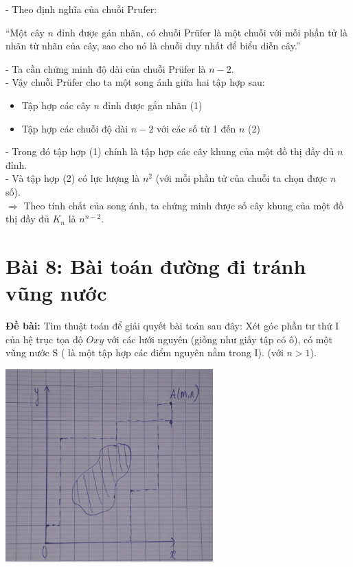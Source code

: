 \documentclass[12pt]{article}
\begin{document}
\begin{sloppypar}
- Theo định nghĩa của chuỗi Prufer:

\begin{center}
``Một cây \(n\) đỉnh được gán nhãn, có chuỗi Prüfer là một chuỗi với mỗi phần tử là nhãn từ  nhãn của cây, sao cho nó là chuỗi duy nhất để biểu diễn cây.''
\end{center}

- Ta cần chứng minh độ dài của chuỗi Prüfer là \(n-2\). \\
- Vậy chuỗi Prüfer cho ta một song ánh giữa hai tập hợp sau:

\begin{itemize}
    \item Tập hợp các cây \(n\) đỉnh được gắn nhãn                      (1)
    \item Tập hợp các chuỗi độ dài \(n-2\) với các số từ 1 đến \(n\)    (2)
\end{itemize}

- Trong đó tập hợp (1) chính là tập hợp các cây khung của một đồ thị đầy đủ \(n\) đỉnh. \\
- Và tập hợp (2) có lực lượng là \(n^{2}\) (với mỗi phần tử của chuỗi ta chọn được \(n\) số). \\
\(\Rightarrow\) Theo tính chất của song ánh, ta chứng minh được số cây khung của một đồ thị đầy đủ \(K_{n}\) là \(n^{n-2}\).

\section{Bài 8: Bài toán đường đi tránh vũng nước}
\begin{tcolorbox}
    \textbf{Đề bài:} Tìm thuật toán để giải quyết bài toán sau đây: Xét góc phần tư thứ I của hệ trục tọa độ \(Oxy\) với các lưới nguyên (giống như giấy tập có ô), có một vũng nước S ( là một tập hợp các điểm nguyên nằm trong I).
    (với \(n > 1\)).
\end{tcolorbox}

\begin{center}
    {\includegraphics[width=8cm]{7.png}}
\end{center}


\end{sloppypar}
\end{document}
